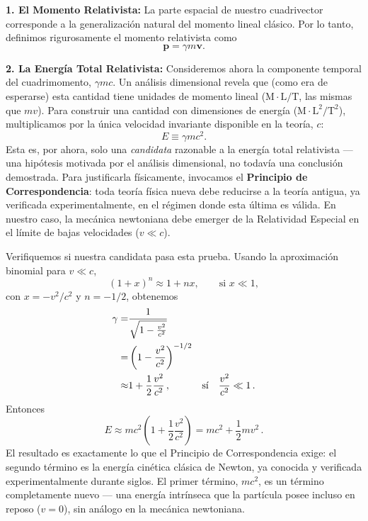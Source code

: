 \documentclass[11pt,a4paper]{book}
\begin{document}
\textbf{1. El Momento Relativista:}
La parte espacial de nuestro cuadrivector corresponde a la generalización natural del momento lineal clásico. Por lo tanto, definimos rigurosamente el momento relativista como
\begin{equation}
    \boldsymbol{p} = \gamma m \boldsymbol{v}.
    \label{eq:momento_relativista}
\end{equation}

\textbf{2. La Energía Total Relativista:}
Consideremos ahora la componente temporal del
cuadrimomento, $\gamma mc$. Un análisis dimensional revela que (como era de esperarse) esta cantidad tiene
unidades de momento lineal ($\text{M}\cdot\text{L}/\text{T}$, las mismas que $mv$). Para construir una cantidad con dimensiones de energía
($\text{M}\cdot\text{L}^2/\text{T}^2$), multiplicamos por la única velocidad
invariante disponible en la teoría, $c$:
\begin{equation}
    E \equiv \gamma mc^2 .
\end{equation}
Esta es, por ahora, solo una \emph{candidata} razonable a la energía total relativista
--- una hipótesis motivada por el análisis dimensional, no todavía una conclusión
demostrada. Para justificarla físicamente, invocamos el \textbf{Principio de
Correspondencia}: toda teoría física nueva debe reducirse a la teoría antigua,
ya verificada experimentalmente, en el régimen donde esta última es válida. En
nuestro caso, la mecánica newtoniana debe emerger de la Relatividad Especial en
el límite de bajas velocidades ($v \ll c$).

Verifiquemos si nuestra candidata pasa esta prueba. Usando la aproximación
binomial para $v \ll c$,
\begin{equation}
    (1+x)^n \approx 1 + nx, \qquad \text{si } x \ll 1,
\end{equation}
con $x = -v^2/c^2$ y $n = -1/2$, obtenemos
\begin{align*}
\gamma =& \frac{1}{\sqrt{1-\frac{v^2}{c^2}}}&&\\
=& \left(1-\frac{v^2}{c^2}\right)^{-1/2}&&\\
\approx& 1 + \frac{1}{2}\frac{v^2}{c^2}\,,&\text{sí\quad } \frac{v^2}{c^2}\ll 1\,.
\end{align*}
Entonces
\begin{equation}
\label{eq:Ereposomascinetica}
    E \approx m c^2 \left( 1 + \frac{1}{2}\frac{v^2}{c^2} \right) = m c^2 + \frac{1}{2} m v^2\,.
\end{equation}
El resultado es exactamente lo que el Principio de Correspondencia exige: el segundo
término es la energía cinética clásica de Newton, ya conocida y verificada
experimentalmente durante siglos. El primer término, $mc^2$, es un término
completamente nuevo --- una energía intrínseca que la partícula posee incluso en
reposo ($v=0$), sin análogo en la mecánica newtoniana.
\end{document}
